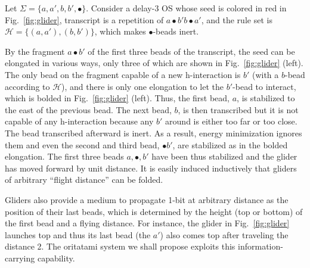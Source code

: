 \begin{example}\label{ex:glider}
Let $\Sigma = \{a, a', b, b', \bullet\}$. 
Consider a delay-3 OS whose seed is colored in red in Fig.~\ref{fig:glider}, transcript is a repetition of $a \bullet b' b \bullet a'$, and the rule set is $\mathcal{H} = \{(a, a'), (b, b')\}$, which makes $\bullet$-beads inert. 

By the fragment $a \bullet b'$ of the first three beads of the transcript, the seed can be elongated in various ways, only three of which are shown in Fig.~\ref{fig:glider} (left). 
The only bead on the fragment capable of a new h-interaction is $b'$ (with a $b$-bead according to $\mathcal{H}$), and there is only one elongation to let the $b'$-bead to interact, which is bolded in Fig.~\ref{fig:glider} (left). 
Thus, the first bead, $a$, is stabilized to the east of the previous bead. 
The next bead, $b$, is then transcribed but it is not capable of any h-interaction because any $b'$ around is either too far or too close.  
The bead transcribed afterward is inert. 
As a result, energy minimization ignores them and even the second and third bead, $\bullet b'$, are stabilized as in the bolded elongation. 
The first three beads $a, \bullet, b'$ have been thus stabilized and the glider has moved forward by unit distance. 
It is easily induced inductively that gliders of arbitrary ``flight distance'' can be folded. 


Gliders also provide a medium to propagate 1-bit at arbitrary distance as the position of their last beads, which is determined by the height (top or bottom) of the first bead and a flying distance.  
For instance, the glider in Fig.~\ref{fig:glider} launches top and thus its last bead (the $a'$) also comes top after traveling the distance 2.
The oritatami system we shall propose exploits this information-carrying capability.
\end{example}

